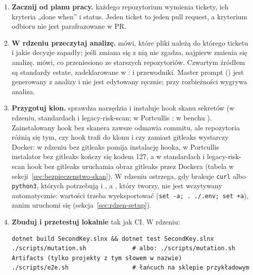 \begin{enumerate}
  \item \textbf{Zacznij od planu pracy.}  każdego repozytorium
        wymienia tickety, ich kryteria „done when” i status. Jeden ticket to jeden pull
        request, a kryterium odbioru nie jest parafrazowane w PR.
  \item \textbf{W rdzeniu przeczytaj analizę.}  mówi, które
        pliki należą do którego ticketu i jakie decyzje zapadły; jeśli zmiana się z nią
        nie zgadza, najpierw zmienia się analizę.  mówi, co
        przeniesiono ze starszych repozytoriów. Czwartym źródłem są standardy estate,
        zadeklarowane w :
        i przewodniki. Master prompt () jest
        generowany z analizy i nie jest edytowany ręcznie; przy rozbieżności wygrywa analiza.
  \item \textbf{Przygotuj klon.}  sprawdza narzędzia i instaluje
        hook skanu sekretów (w rdzeniu, standardach i legacy-risk-scan; w Portcullis
        ; w benchu
        ). Zainstalowany hook bez skanera
        zawsze odmawia commitu, ale repozytoria różnią się tym, czy hook trafi do klonu
        i czy zamiast gitleaks wystarczy Docker: w rdzeniu  bez gitleaks
        pomija instalację hooka, w Portcullis instalator bez gitleaks kończy się kodem 127,
        a w standardach i legacy-risk-scan hook bez gitleaks uruchamia obraz gitleaks przez
        Dockera (tabela w sekcji~\ref{sec:bezpieczenstwo-skan}). W rdzeniu
         ostrzega, gdy brakuje \texttt{curl} albo \texttt{python3},
        których potrzebują  i , a ,
        który tworzy, nie jest wczytywany automatycznie: wartości trzeba wyeksportować
        (\texttt{set -a; . ./.env; set +a}), zanim uruchomi się 
        (sekcja~\ref{sec:rdzen-setup}).
  \item \textbf{Zbuduj i przetestuj lokalnie} tak jak CI. W rdzeniu:
\begin{lstlisting}
dotnet build SecondKey.slnx && dotnet test SecondKey.slnx
./scripts/mutation.sh             # albo: ./scripts/mutation.sh Artifacts (tylko projekty z tym słowem w nazwie)
./scripts/e2e.sh                  # łańcuch na sklepie przykładowym

\end{lstlisting}
\end{enumerate}
